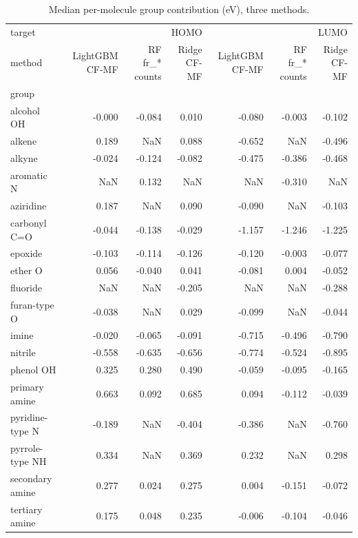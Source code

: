 \begin{table}
\caption{Median per-molecule group contribution (eV), three methods.}
\label{tab:groups}
\begin{tabular}{lrrrrrr}
\toprule
target & \multicolumn{3}{r}{HOMO} & \multicolumn{3}{r}{LUMO} \\
method & LightGBM CF-MF & RF fr\_* counts & Ridge CF-MF & LightGBM CF-MF & RF fr\_* counts & Ridge CF-MF \\
group &  &  &  &  &  &  \\
\midrule
alcohol OH & -0.000 & -0.084 & 0.010 & -0.080 & -0.003 & -0.102 \\
alkene & 0.189 & NaN & 0.088 & -0.652 & NaN & -0.496 \\
alkyne & -0.024 & -0.124 & -0.082 & -0.475 & -0.386 & -0.468 \\
aromatic N & NaN & 0.132 & NaN & NaN & -0.310 & NaN \\
aziridine & 0.187 & NaN & 0.090 & -0.090 & NaN & -0.103 \\
carbonyl C=O & -0.044 & -0.138 & -0.029 & -1.157 & -1.246 & -1.225 \\
epoxide & -0.103 & -0.114 & -0.126 & -0.120 & -0.003 & -0.077 \\
ether O & 0.056 & -0.040 & 0.041 & -0.081 & 0.004 & -0.052 \\
fluoride & NaN & NaN & -0.205 & NaN & NaN & -0.288 \\
furan-type O & -0.038 & NaN & 0.029 & -0.099 & NaN & -0.044 \\
imine & -0.020 & -0.065 & -0.091 & -0.715 & -0.496 & -0.790 \\
nitrile & -0.558 & -0.635 & -0.656 & -0.774 & -0.524 & -0.895 \\
phenol OH & 0.325 & 0.280 & 0.490 & -0.059 & -0.095 & -0.165 \\
primary amine & 0.663 & 0.092 & 0.685 & 0.094 & -0.112 & -0.039 \\
pyridine-type N & -0.189 & NaN & -0.404 & -0.386 & NaN & -0.760 \\
pyrrole-type NH & 0.334 & NaN & 0.369 & 0.232 & NaN & 0.298 \\
secondary amine & 0.277 & 0.024 & 0.275 & 0.004 & -0.151 & -0.072 \\
tertiary amine & 0.175 & 0.048 & 0.235 & -0.006 & -0.104 & -0.046 \\
\bottomrule
\end{tabular}
\end{table}

